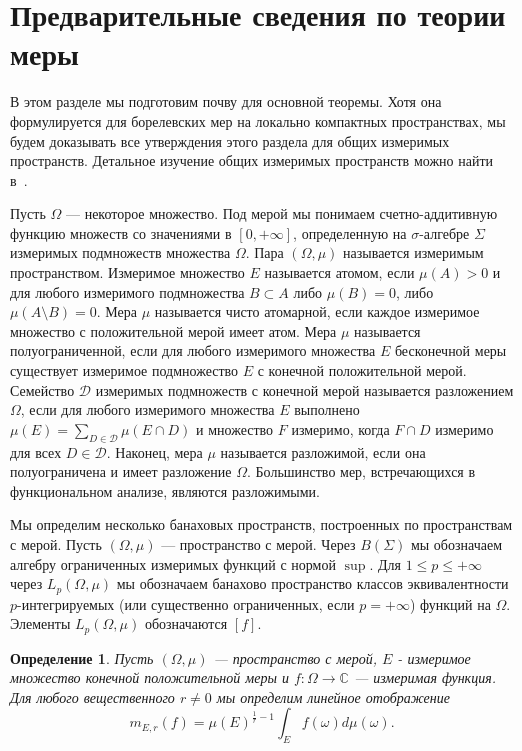 \documentclass[12pt]{article}
\newtheorem{definition}[theorem]{Определение}
\begin{document}

\section{Предварительные сведения по теории меры}
\label{MeasThPrelim}

В этом разделе мы подготовим почву для основной теоремы. Хотя она формулируется 
для борелевских мер на локально компактных пространствах, мы будем доказывать 
все утверждения этого раздела для общих измеримых пространств. Детальное 
изучение общих измеримых пространств можно найти в~\cite{FremMeasTh2}.

Пусть $\Omega$ --- некоторое множество. Под мерой мы понимаем счетно-аддитивную 
функцию множеств со значениями в $[0,+\infty]$, определенную 
на $\sigma$-алгебре $\Sigma$ измеримых подмножеств множества $\Omega$. 
Пара $(\Omega,\mu)$ называется измеримым пространством. 
Измеримое множество $E$ называется атомом, если $\mu(A)>0$ и для любого 
измеримого подмножества $B\subset A$ либо $\mu(B)=0$, 
либо $\mu(A\setminus B)=0$. Мера $\mu$ называется чисто атомарной, если каждое 
измеримое множество с положительной мерой имеет атом. Мера $\mu$ называется 
полуограниченной, если для любого измеримого множества $E$ бесконечной меры 
существует измеримое подмножество $E$ с конечной положительной мерой. 
Семейство $\mathcal{D}$ измеримых подмножеств с конечной мерой называется 
разложением $\Omega$, если для любого измеримого множества $E$ 
выполнено $\mu(E)=\sum_{D\in\mathcal{D}}\mu(E\cap D)$ и множество $F$ измеримо, 
когда $F\cap D$ измеримо для всех $D\in\mathcal{D}$. Наконец, мера $\mu$ 
называется разложимой, если она полуограничена и имеет разложение $\Omega$. 
Большинство мер, встречающихся в функциональном анализе, являются разложимыми.

Мы определим несколько банаховых пространств, построенных по пространствам с 
мерой. Пусть $(\Omega,\mu)$ --- пространство с мерой. Через $B(\Sigma)$ мы 
обозначаем алгебру ограниченных измеримых функций с нормой $\sup$. 
Для $1\leq p\leq +\infty$ через $L_p(\Omega,\mu)$ мы обозначаем банахово 
пространство классов эквивалентности $p$-интегрируемых (или существенно 
ограниченных, если $p=+\infty$) функций на $\Omega$. Элементы $L_p(\Omega,\mu)$ 
обозначаются $[f]$.

\begin{definition}\label{GnrlzdMean}
    Пусть $(\Omega,\mu)$ --- пространство с мерой, $E$ - измеримое множество 
    конечной положительной меры и $f:\Omega\to\mathbb{C}$ --- измеримая 
    функция. Для любого вещественного $r\neq 0$ мы определим линейное 
    отображение
    \[
        m_{E,r}(f)=\mu(E)^{\frac{1}{r}-1}\int_E f(\omega)d\mu(\omega).
    \]
\end{definition}
\end{document}
